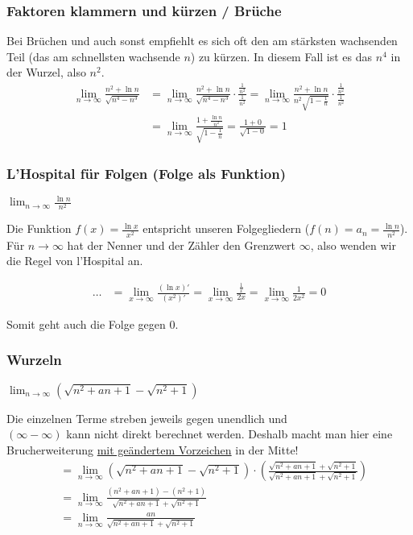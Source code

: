 \subsubsection{Faktoren klammern und kürzen / Brüche}
Bei Brüchen und auch sonst empfiehlt es sich oft den am stärksten wachsenden Teil (das am
schnellsten wachsende $n$) zu kürzen. In diesem Fall ist es das $n^4$ in der
Wurzel, also $n^2$.
\vspace{0.1cm}
\begin{align*}
\lim_{n \to \infty} \frac{n^2 + \ln n}{\sqrt{n^4 - n^3}} 
&= \lim_{n \to \infty} \frac{n^2 + \ln n}{\sqrt{n^4 - n^3}} 
\cdot \frac{\frac{1}{n^2}}{\frac{1}{n^2}} = \lim_{n \to \infty} \frac{n^2 + \ln
n}{n^2 \sqrt{1 - \frac{1}{n}}} \cdot \frac{\frac{1}{n^2}}{\frac{1}{n^2}} \\
&= \lim_{n \to \infty} \frac{1 + \frac{\ln n}{n^2}}{\sqrt{1 - \frac{1}{n}}}
= \frac{1 + 0}{\sqrt{1 - 0}} = 1
\end{align*}

\subsubsection[L'hospital]{L'Hospital für Folgen (Folge als Funktion)}
$\lim_{n \to \infty} \frac{\ln n}{n^2}$

Die Funktion $f(x) = \frac{\ln x}{x^2}$ entspricht unseren Folgegliedern ($f(n)
= a_n = \frac{\ln n}{n^2}$). Für $n \to \infty$ hat der Nenner und der Zähler
den Grenzwert $\infty$, also wenden wir die Regel von l'Hospital an.

\begin{align*}
\ldots &= \lim_{x \to \infty} \frac{(\ln x)'}{(x^2)'} = \lim_{x \to \infty}
\frac{\frac{1}{x}}{2x} = \lim_{x \to \infty} \frac{1}{2x^2} = 0
\end{align*}

Somit geht auch die Folge gegen 0.

\subsubsection{Wurzeln}
$\lim_{n \to \infty} (\sqrt{n^2 + an + 1} - \sqrt{n^2 + 1})$

Die einzelnen Terme streben jeweils gegen unendlich und \\
$(\infty - \infty)$ kann nicht direkt berechnet werden. Deshalb macht man hier eine Brucherweiterung \underline{mit geändertem Vorzeichen} in der Mitte!
\begin{align*}
&= \lim_{n \to \infty} (\sqrt{n^2 + an + 1} - \sqrt{n^2 + 1}) \cdot
\left(\frac{\sqrt{n^2 + an + 1} + \sqrt{n^2 + 1}}{\sqrt{n^2 + an + 1} +
\sqrt{n^2 + 1}} \right) \\
&= \lim_{n \to \infty} \frac{(n^2 + an + 1) - (n^2 + 1)}{\sqrt{n^2 + an + 1} +
\sqrt{n^2 + 1}} \\
&= \lim_{n \to \infty} \frac{an}{\sqrt{n^2 + an + 1} + \sqrt{n^2 + 1}} 
\end{align*}

